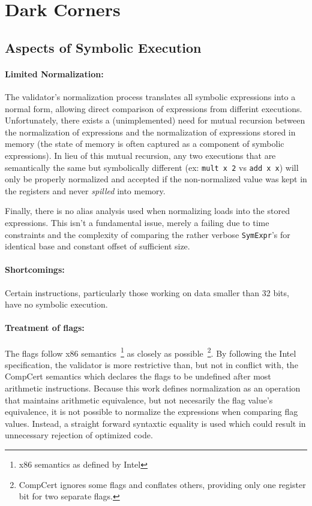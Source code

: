 \documentclass{article}
\begin{document}
\section{Dark Corners}
\subsection{Aspects of Symbolic Execution}
\paragraph{Limited Normalization: }The validator's normalization
process translates all symbolic expressions into a normal form,
allowing direct comparison of expressions from differint executions.
Unfortunately, there exists a (unimplemented) need for mutual
recursion between the normalization of expressions and the
normalization of expressions stored in memory (the state of memory is
often captured as a component of symbolic expressions).  In lieu of
this mutual recursion, any two executions that are semantically the
same but symbolically different (ex: {\tt mult x 2} vs {\tt add x x})
will only be properly normalized and accepted if the non-normalized
value was kept in the registers and never {\it spilled} into memory.

Finally, there is no alias analysis used when normalizing loads into
the stored expressions.  This isn't a fundamental issue, merely a
failing due to time constraints and the complexity of comparing the
rather verbose {\tt SymExpr}'s for identical base and constant offset
of sufficient size.

\paragraph{Shortcomings: }
Certain instructions, particularly those working on data
smaller than 32 bits, have no symbolic execution.

\paragraph{Treatment of flags: } 
The flags follow x86 semantics~\footnote{x86 semantics as defined by
  Intel} as closely as possible~\footnote{CompCert ignores some flags
  and conflates others, providing only one register bit for two
  separate flags.}.  By following the Intel specification, the
validator is more restrictive than, but not in conflict with, the
CompCert semantics which declares the flags to be undefined after most
arithmetic instructions.  Because this work defines normalization as
an operation that maintains arithmetic equivalence, but not necesarily
the flag value's equivalence, it is not possible to normalize the
expressions when comparing flag values.  Instead, a straight forward
syntaxtic equality is used which could result in unnecessary rejection
of optimized code.
\end{document}
